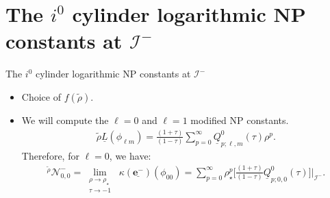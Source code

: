\documentclass{beamer}
\theoremstyle{remark}
\theoremstyle{plain}
\theoremstyle{plain}
\begin{document}
\section{The $i^0$ cylinder logarithmic NP constants at $\mathscr{I}^{-}$}
\begin{frame}{The $i^0$ cylinder logarithmic NP constants at $\mathscr{I}^{-}$}
  \begin{itemize}
    \item Choice of $f(\tilde{\rho})$.
    \vspace{5mm}
    \item We will compute the $\ell=0$ and $\ell=1$ modified NP constants.
    \begin{align}
      \tilde{\rho}\underline{L} (\phi_{\ell m}) = \frac{(1+\tau)}{(1-\tau)}\sum_{p=0}^{\infty}\underline{Q}^{0}_{p;\ell,m}(\tau)\rho^p. \nonumber
    \end{align}
    Therefore, for $\ell=0$, we have:
    \begin{align}
      \mathcal{}^{\tilde{\rho}}\mathcal{N}^{-}_{0,0} = \lim_{\substack{\rho \to \rho_{\star} \\ \tau \to -1}} \; \kappa(\underline{\boldsymbol{e}^{-}})(\phi_{00}) = \sum_{p=0}^{\infty}\rho_{\star}^p\biggl[\frac{(1+\tau)}{(1-\tau)}\underline{Q}^{0}_{p;0,0}(\tau)\biggr]|_{\mathscr{I}^{-}}. \nonumber
    \end{align}
  \end{itemize}
\end{frame}
\end{document}
